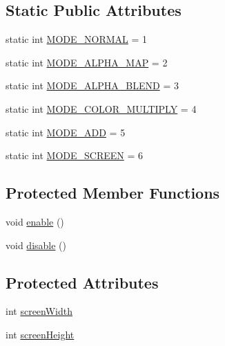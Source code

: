 \subsection*{Static Public Attributes}
\begin{DoxyCompactItemize}
\item 
static int \mbox{\hyperlink{classorg_1_1newdawn_1_1slick_1_1_graphics_a6c86775094fb5d410585e92692c35599}{M\+O\+D\+E\+\_\+\+N\+O\+R\+M\+AL}} = 1
\item 
static int \mbox{\hyperlink{classorg_1_1newdawn_1_1slick_1_1_graphics_a5b49f0f7eba96853f6a1e337ff44fb0e}{M\+O\+D\+E\+\_\+\+A\+L\+P\+H\+A\+\_\+\+M\+AP}} = 2
\item 
static int \mbox{\hyperlink{classorg_1_1newdawn_1_1slick_1_1_graphics_a02782fadf540222d2928c940ea4f70a4}{M\+O\+D\+E\+\_\+\+A\+L\+P\+H\+A\+\_\+\+B\+L\+E\+ND}} = 3
\item 
static int \mbox{\hyperlink{classorg_1_1newdawn_1_1slick_1_1_graphics_a1bb0f384b29ad617afdcfa66b62ec62a}{M\+O\+D\+E\+\_\+\+C\+O\+L\+O\+R\+\_\+\+M\+U\+L\+T\+I\+P\+LY}} = 4
\item 
static int \mbox{\hyperlink{classorg_1_1newdawn_1_1slick_1_1_graphics_ac9c78eaf19b07863027544b34d2a57db}{M\+O\+D\+E\+\_\+\+A\+DD}} = 5
\item 
static int \mbox{\hyperlink{classorg_1_1newdawn_1_1slick_1_1_graphics_aa6acd283f373a2f8a1239a74aa5c004d}{M\+O\+D\+E\+\_\+\+S\+C\+R\+E\+EN}} = 6
\end{DoxyCompactItemize}
\subsection*{Protected Member Functions}
\begin{DoxyCompactItemize}
\item 
void \mbox{\hyperlink{classorg_1_1newdawn_1_1slick_1_1_graphics_a094766a3a763c402d5d077710b4d3fc5}{enable}} ()
\item 
void \mbox{\hyperlink{classorg_1_1newdawn_1_1slick_1_1_graphics_a7979c584c48fc28175289e0012d5c943}{disable}} ()
\end{DoxyCompactItemize}
\subsection*{Protected Attributes}
\begin{DoxyCompactItemize}
\item 
int \mbox{\hyperlink{classorg_1_1newdawn_1_1slick_1_1_graphics_adbb4b10050a8bcf8e496130509784f71}{screen\+Width}}
\item 
int \mbox{\hyperlink{classorg_1_1newdawn_1_1slick_1_1_graphics_a24cd14275ad2dcd82fcd843ceab6a80b}{screen\+Height}}
\end{DoxyCompactItemize}
